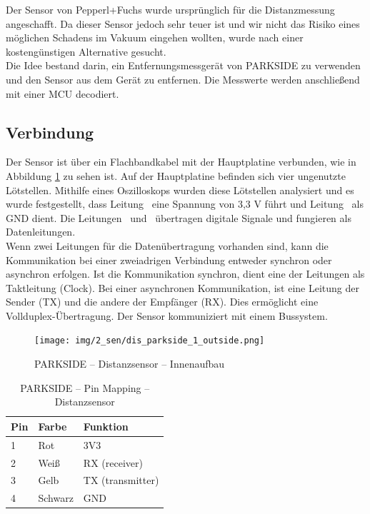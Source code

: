 Der Sensor von Pepperl+Fuchs wurde ursprünglich für die Distanzmessung angeschafft. Da dieser Sensor jedoch sehr teuer ist und wir nicht das Risiko eines möglichen Schadens im Vakuum eingehen wollten, wurde nach einer kostengünstigen Alternative gesucht.\\
Die Idee bestand darin, ein Entfernungsmessgerät von PARKSIDE zu verwenden und den Sensor aus dem Gerät zu entfernen. Die Messwerte werden anschließend mit einer MCU decodiert.

\subsection{Verbindung}
Der Sensor ist über ein Flachbandkabel mit der Hauptplatine verbunden, wie in Abbildung \ref{img_2_2:sen_dis_parkside:1} zu sehen ist. Auf der Hauptplatine befinden sich vier ungenutzte Lötstellen. Mithilfe eines Oszilloskops wurden diese Lötstellen analysiert und es wurde festgestellt, dass Leitung \flqq\ eine Spannung von 3,3 V führt und Leitung \flqq\ als GND dient. Die Leitungen \flqq\ und \flqq\ übertragen digitale Signale und fungieren als Datenleitungen.\\
Wenn zwei Leitungen für die Datenübertragung vorhanden sind, kann die Kommunikation bei einer zweiadrigen Verbindung entweder synchron oder asynchron erfolgen. Ist die Kommunikation synchron, dient eine der Leitungen als Taktleitung (Clock). Bei einer asynchronen Kommunikation, ist eine Leitung der Sender (TX) und die andere der Empfänger (RX). Dies ermöglicht eine Vollduplex-Übertragung.
Der Sensor kommuniziert mit einem Bussystem.



\pagebreak[1]
\begin{figure}[ht]
	\begin{center}
		\texttt{[image: img/2\_sen/dis\_parkside\_1\_outside.png]}
		\caption{PARKSIDE – Distanzsensor – Innenaufbau}
		\label{img_2_2:sen_dis_parkside:1}
	\end{center}
\end{figure}
\pagebreak[1]

\pagebreak[1]
\begin{table}[ht]
	\centering
	\caption{PARKSIDE – Pin Mapping – Distanzsensor}
	\label{parkside:pinmapping}
	\begin{tabular}{l|ll}
		\hline
		\textbf{Pin} & \textbf{Farbe} & \textbf{Funktion} \\ \hline
		1            & Rot            & 3V3               \\
		2            & Weiß           & RX (receiver)     \\
		3            & Gelb           & TX (transmitter)  \\
		4            & Schwarz        & GND               \\ \hline
	\end{tabular}
\end{table}
\pagebreak[1]







